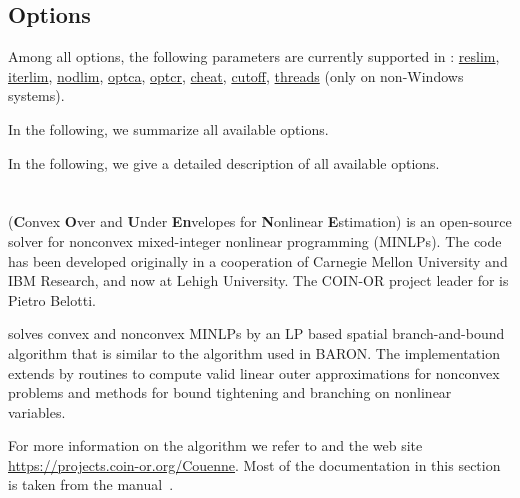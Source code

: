 
\subsection{Options}

Among all \CBC options, the following \GAMS parameters are currently supported in \CBC:
\hyperlink{reslim}{reslim}, \hyperlink{iterlim}{iterlim}, \hyperlink{nodlim}{nodlim}, \hyperlink{optca}{optca}, \hyperlink{optcr}{optcr}, \hyperlink{increment}{cheat}, \hyperlink{cutoff}{cutoff}, \hyperlink{threads}{threads} (only on non-Windows systems).

In the following, we summarize all available \CBC options.

In the following, we give a detailed description of all available \CBC options.

\section{\COUENNE}


\COUENNE (\textbf{C}onvex \textbf{O}ver and \textbf{U}nder \textbf{En}velopes for \textbf{N}onlinear \textbf{E}stimation) is an open-source solver for nonconvex mixed-integer nonlinear programming (MINLPs).
The code has been developed originally in a cooperation of Carnegie Mellon University and IBM Research, and now at Lehigh University.
The COIN-OR project leader for \COUENNE is Pietro Belotti.

\COUENNE solves convex and nonconvex MINLPs by an LP based spatial branch-and-bound algorithm that is similar to the algorithm used in \textsc{BARON}.
The implementation extends \BONMIN by routines to compute valid linear outer approximations for nonconvex problems and methods for bound tightening and branching on nonlinear variables.

For more information on the algorithm we refer to \cite{Be09,BeLeLiMaWa08} and the \COUENNE web site \url{https://projects.coin-or.org/Couenne}.
Most of the \COUENNE documentation in this section is taken from the \COUENNE manual~\cite{CouenneManual}.


